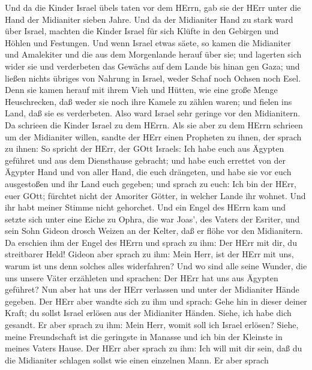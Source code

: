  Und da die Kinder Israel übels taten vor dem HErrn, gab sie
der HErr unter die Hand der Midianiter sieben Jahre.  Und da
der Midianiter Hand zu stark ward über Israel, machten die Kinder Israel
für sich Klüfte in den Gebirgen und Höhlen und Festungen. 
Und wenn Israel etwas säete, so kamen die Midianiter und Amalekiter und
die aus dem Morgenlande herauf über sie;  und lagerten sich
wider sie und verderbeten das Gewächs auf dem Lande bis hinan gen Gaza;
und ließen nichts übriges von Nahrung in Israel, weder Schaf noch Ochsen
noch Esel.  Denn sie kamen herauf mit ihrem Vieh und Hütten,
wie eine große Menge Heuschrecken, daß weder sie noch ihre Kamele zu
zählen waren; und fielen ins Land, daß sie es verderbeten. 
Also ward Israel sehr geringe vor den Midianitern. Da schrieen die
Kinder Israel zu dem HErrn.  Als sie aber zu dem HErrn
schrieen um der Midianiter willen,  sandte der HErr einen
Propheten zu ihnen, der sprach zu ihnen: So spricht der HErr, der GOtt
Israels: Ich habe euch aus Ägypten geführet und aus dem Diensthause
gebracht;  und habe euch errettet von der Ägypter Hand und
von aller Hand, die euch drängeten, und habe sie vor euch ausgestoßen
und ihr Land euch gegeben;  und sprach zu euch: Ich bin der
HErr, euer GOtt; fürchtet nicht der Amoriter Götter, in welcher Lande
ihr wohnet. Und ihr habt meiner Stimme nicht gehorchet. 
Und ein Engel des HErrn kam und setzte sich unter eine Eiche zu Ophra,
die war Joas', des Vaters der Esriter, und sein Sohn Gideon drosch
Weizen an der Kelter, daß er flöhe vor den Midianitern.  Da
erschien ihm der Engel des HErrn und sprach zu ihm: Der HErr mit dir, du
streitbarer Held!  Gideon aber sprach zu ihm: Mein Herr,
ist der HErr mit uns, warum ist uns denn solches alles widerfahren? Und
wo sind alle seine Wunder, die uns unsere Väter erzähleten und sprachen:
Der HErr hat uns aus Ägypten geführet? Nun aber hat uns der HErr
verlassen und unter der Midianiter Hände gegeben.  Der HErr
aber wandte sich zu ihm und sprach: Gehe hin in dieser deiner Kraft; du
sollst Israel erlösen aus der Midianiter Händen. Siehe, ich habe dich
gesandt.  Er aber sprach zu ihm: Mein Herr, womit soll ich
Israel erlösen? Siehe, meine Freundschaft ist die geringste in Manasse
und ich bin der Kleinste in meines Vaters Hause.  Der HErr
aber sprach zu ihm: Ich will mit dir sein, daß du die Midianiter
schlagen sollst wie einen einzelnen Mann.  Er aber sprach
